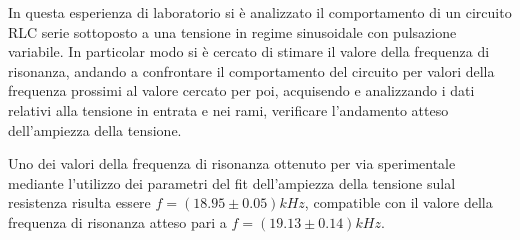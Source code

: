 In questa esperienza di laboratorio si è analizzato il comportamento di un circuito RLC serie sottoposto a una tensione
in regime sinusoidale con pulsazione variabile.
In particolar modo si è cercato di stimare il valore della frequenza di risonanza, andando a confrontare il comportamento
del circuito per valori della frequenza prossimi
al valore cercato per poi, acquisendo e analizzando i dati relativi alla tensione in entrata e nei rami, verificare
l’andamento atteso dell’ampiezza della tensione.

Uno dei valori della frequenza di risonanza ottenuto per via sperimentale mediante l'utilizzo dei parametri del fit dell'ampiezza
della tensione sulal resistenza risulta essere $f = (18.95 \pm 0.05) kHz$, compatible con il valore
della frequenza di risonanza atteso pari a $f = (19.13 \pm 0.14) kHz$. %


